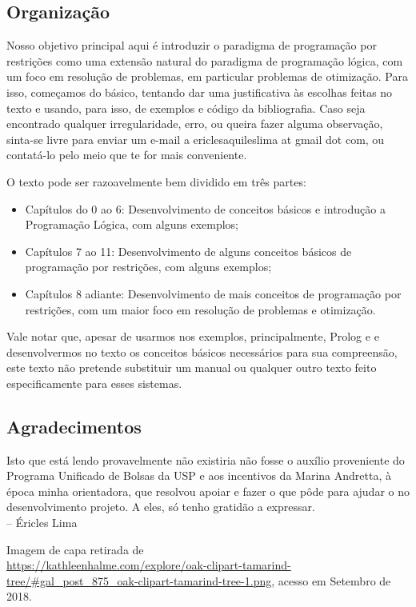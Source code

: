 \documentclass{article}
\begin{document}
\subsection*{Organização}

Nosso objetivo principal aqui é introduzir o paradigma de programação
por restrições como uma extensão natural do paradigma de programação
lógica, com um foco em resolução de problemas, em particular problemas
de otimização. Para isso, começamos do básico, tentando dar uma
justificativa às escolhas feitas no texto e usando, para isso, de
exemplos e código da bibliografia. Caso seja encontrado qualquer
irregularidade, erro, ou queira fazer alguma observação, sinta-se
livre para enviar um e-mail a ericlesaquileslima at gmail dot com, ou
contatá-lo pelo meio que te for mais conveniente.

O texto pode ser razoavelmente bem dividido em três partes:
\begin{itemize}
\item Capítulos do 0 ao 6: Desenvolvimento de conceitos básicos e
  introdução a Programação Lógica, com alguns exemplos;
\item Capítulos 7 ao 11: Desenvolvimento de alguns conceitos básicos
  de programação por restrições, com alguns exemplos;
\item Capítulos 8 adiante: Desenvolvimento de mais conceitos de
  programação por restrições, com um maior foco em resolução de
  problemas e otimização.
\end{itemize}

Vale notar que, apesar de usarmos nos exemplos, principalmente, Prolog
e \eclipse e desenvolvermos no texto os conceitos básicos necessários
para sua compreensão, este texto não pretende substituir um manual ou
qualquer outro texto feito especificamente para esses sistemas.

\subsection*{Agradecimentos}

Isto que está lendo provavelmente não existiria não fosse o auxílio
proveniente do Programa Unificado de Bolsas da USP e aos incentivos
da Marina Andretta, à época minha orientadora, que resolvou apoiar e
fazer o que pôde para ajudar o no desenvolvimento projeto. A eles, só
tenho gratidão a expressar.\\
-- Éricles Lima

Imagem de capa retirada de\\
\url{https://kathleenhalme.com/explore/oak-clipart-tamarind-tree/#gal_post_875_oak-clipart-tamarind-tree-1.png}, acesso em Setembro de 2018.
\end{document}
